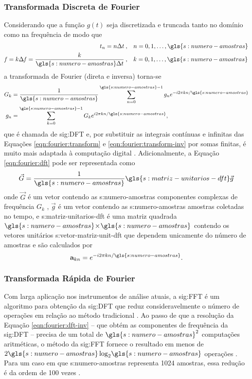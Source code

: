 \documentclass[12pt,oneside,english,brazil,lmodern,siglas,simbolos,cite=num]{ucsmonograph}
\begin{document}
	\subsubsection{Transformada Discreta de Fourier}
	Considerando que a função $g(t)$ seja discretizada e truncada tanto no domínio como na frequência de modo que
	\begin{align*}
		t_n = n\Delta t\: ,&\quad n = 0, 1, \dots , \gls{s:numero-amostras}\\
		\mathit{f} = k\Delta\mathit{f} = \frac{k}{\gls{s:numero-amostras}\Delta t}\: ,&\quad k = 0, 1, \dots , \gls{s:numero-amostras}
	\end{align*}
	a transformada de Fourier (direta e inversa) torna-se \cite{randall:1987}
	\begin{align}
		G_k &= \frac{1}{\gls{s:numero-amostras}}\sum_{n=0}^{\gls{s:numero-amostras}-1}g_n e^{-i 2\pi k n/\gls{s:numero-amostras}} \label{eqn:fourier:dft}\\
		g_n &= \sum_{k=0}^{\gls{s:numero-amostras}-1}G_k e^{i 2\pi k n/\gls{s:numero-amostras}} \label{eqn:fourier:dft-inv},
	\end{align}
	que é chamada de \gls{sig:DFT} e, por substituir as integrais contínuas e infinitas das Equações \ref{eqn:fourier:transform} e \ref{eqn:fourier:transform-inv} por somas finitas, é muito mais adaptada à computação digital \cite{randall:1987}.
	Adicionalmente, a Equação \ref{eqn:fourier:dft} pode ser representada como \cite{dimarogonas:1995}
	\begin{equation} \label{eqn:fourier:dft-matricial}
		\vec{G} = \frac{1}{\gls{s:numero-amostras}}\gls{s:matriz-unitarios-dft}\vec{g}
	\end{equation}
	onde $ \vec{G} $ é um vetor contendo as \gls{s:numero-amostras} componentes complexas de frequência $ G_k $ , $ \vec{g} $ é um vetor contendo as \gls{s:numero-amostras} amostras coletadas no tempo, e \gls{s:matriz-unitarios-dft} é uma matriz quadrada $ \gls{s:numero-amostras}\! \times\!	\gls{s:numero-amostras} $ contendo os vetores unitários \gls{s:vetor-matriz-unit-dft} que dependem unicamente do número de amostras e são calculados por
	\begin{equation}
		\textbf{a}_{kn} = e^{-i2\pi kn/\gls{s:numero-amostras}}.
	\end{equation}
	
	\subsubsection{Transformada Rápida de Fourier}
	Com larga aplicação nos instrumentos de análise atuais, a \gls{sig:FFT} é um algoritmo para obtenção da \gls{sig:DFT} que reduz consideravelmente o número de operações em relação ao método tradicional \cite{randall:1987}.
	Ao passo de que a resolução da Equação \ref{eqn:fourier:dft-inv} -- que obtém as componentes de frequência da \gls{sig:DFT} -- precisa de um total de $ \gls{s:numero-amostras}^2 $ computações aritméticas, o método da \gls{sig:FFT} fornece o resultado em menos de $ 2\gls{s:numero-amostras} \log_2\! \gls{s:numero-amostras} $ operações \cite{cooley:1965}.
	Para um caso em que \gls{s:numero-amostras} representa 1024 amostras, essa redução é da ordem de 100 vezes \cite{randall:1987}.	
	
\end{document}
